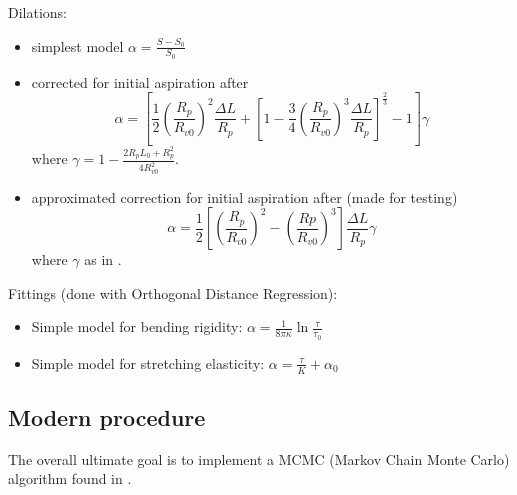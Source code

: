Dilations:
\begin{itemize}
	\item simplest model $\alpha = \frac{S-S_0}{S_0}$
	\item corrected for initial aspiration after \cite{Henriksen2004}
	\begin{equation}
		\alpha = \left[
		 \frac{1}{2} \left(\frac{R_p}{R_{v0}}\right)^2 \frac{\Delta L}{R_p} 
		 + \left[1-\frac{3}{4}\left(\frac{R_p}{R_{v0}}\right)^3 \frac{\Delta L}{R_p} \right]^{\frac{2}{3}}
		 - 1 
		\right]\gamma
		\label{eq:alpha-henriksen}
	\end{equation}
	where $\displaystyle{\gamma = 1-\frac{2R_p L_0+R_p^2}{4R_{v0}^2}}$.
	\item approximated correction for initial aspiration after \cite{Henriksen2004} (made for testing)
	\begin{equation}
		\alpha = \frac{1}{2}\left[
		\left(\frac{R_p}{R_{v0}}\right)^2-\left(\frac{Rp}{R_{v0}}\right)^3\right]
		\frac{\Delta L}{R_p}\gamma
		\label{eq:alpha-henriksen-simple}
	\end{equation}
	where $\gamma$ as in .
\end{itemize}

Fittings (done with Orthogonal Distance Regression):
\begin{itemize}
	\item Simple model for bending rigidity: $\alpha=\frac{1}{8\pi\kappa}\ln{\frac{\tau}{\tau_0}}$
	\item Simple model for stretching elasticity: $\alpha=\frac{\tau}{K}+\alpha_0$
\end{itemize}

\subsection{Modern procedure}
The overall ultimate goal is to implement a MCMC (Markov Chain Monte Carlo) algorithm found in  \cite{Henriksen2004}.
